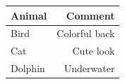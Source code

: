 \documentclass[11pt, a4paper]{article}
\begin{document}
\begin{example}
\begin{gridlayout}{\textwidth}{11cm}
\begin{row}{0.3}
\begin{cell}{0.3}
\begin{tabular}{lr}
                    \toprule
                    Animal & Comment \\
                    \midrule
                    Bird & Colorful back \\
                    Cat & Cute look \\
                    Dolphin & Underwater \\
                    \bottomrule
                \end{tabular}
            \end{cell}
        \end{row}
    \end{gridlayout}
\end{example}








\taskone
\end{document}
